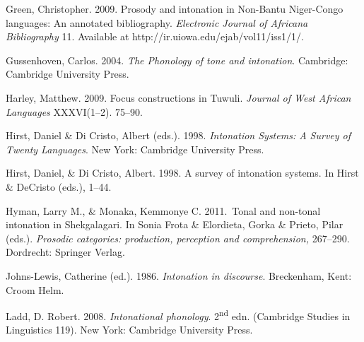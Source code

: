 \documentclass[output=paper]{langsci/langscibook}
\begin{document}
\begin{styleBibliographyiv}
Green, Christopher. 2009. Prosody and intonation in Non-Bantu Niger-Congo languages: An annotated bibliography. \emph{Electronic Journal of Africana Bibliography} 11. Available at http://ir.uiowa.edu/ejab/vol11/iss1/1/.
\end{styleBibliographyiv}

\begin{styleBibliographyiv}
Gussenhoven, Carlos. 2004. \emph{The Phonology of tone and intonation}. Cambridge: Cambridge University Press.
\end{styleBibliographyiv}

\begin{styleBibliographyiv}
Harley, Matthew. 2009. Focus constructions in Tuwuli. \emph{Journal of West African Languages} XXXVI(1–2). 75–90.
\end{styleBibliographyiv}

\begin{styleBibliographyiv}
Hirst, Daniel \& Di Cristo, Albert (eds.). 1998. \emph{Intonation Systems: A Survey of Twenty Languages}. New York: Cambridge University Press.
\end{styleBibliographyiv}

\begin{styleBibliographyiv}
Hirst, Daniel, \& Di Cristo, Albert. 1998. A survey of intonation systems. In Hirst \& DeCristo (eds.), 1–44.
\end{styleBibliographyiv}

\begin{styleBibliographyiv}
Hyman, Larry M., \& Monaka, Kemmonye C. 2011.~Tonal and non-tonal intonation in Shekgalagari. In Sonia Frota \& Elordieta, Gorka \& Prieto, Pilar (eds.). \emph{Prosodic categories: production, perception and comprehension,} 267–290. Dordrecht: Springer Verlag.
\end{styleBibliographyiv}

\begin{styleBibliographyiv}
Johns-Lewis, Catherine (ed.). 1986. \emph{Intonation in discourse}. Breckenham, Kent: Croom Helm.
\end{styleBibliographyiv}

\begin{styleBibliographyiv}
Ladd, D. Robert. 2008. \emph{Intonational phonology}. 2\textsuperscript{nd} edn. (Cambridge Studies in Linguistics 119). New York: Cambridge University Press.
\end{styleBibliographyiv}
\end{document}
